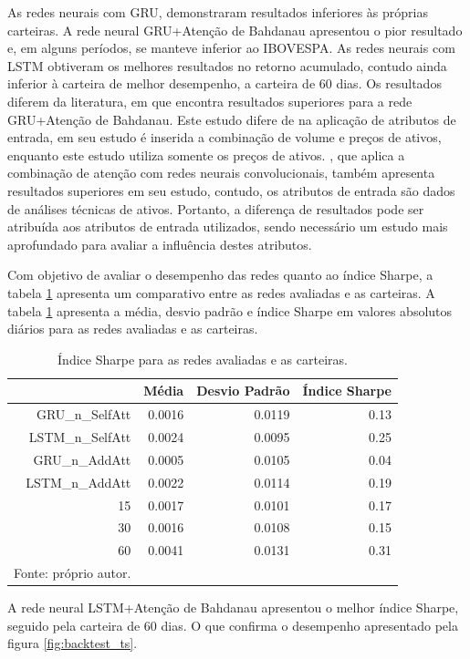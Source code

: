         \ipar As redes neurais com \acrshort{GRU}, demonstraram resultados inferiores às próprias carteiras. A rede neural \acrshort{GRU}+Atenção de Bahdanau apresentou o pior resultado e, em alguns períodos, se manteve inferior ao \acrshort{IBOVESPA}. As redes neurais com \acrshort{LSTM} obtiveram os melhores resultados no retorno acumulado, contudo ainda inferior à carteira de melhor desempenho, a carteira de 60 dias. Os resultados diferem da literatura, em que  encontra resultados superiores para a rede \acrshort{GRU}+Atenção de Bahdanau. Este estudo difere de  na aplicação de atributos de entrada, em seu estudo é inserida a combinação de volume e preços de ativos, enquanto este estudo utiliza somente os preços de ativos. , que aplica a combinação de atenção com redes neurais convolucionais, também apresenta resultados superiores em seu estudo, contudo, os atributos de entrada são dados de análises técnicas de ativos. Portanto, a diferença de resultados pode ser atribuída aos atributos de entrada utilizados, sendo necessário um estudo mais aprofundado para avaliar a influência destes atributos.

        \ipar Com objetivo de avaliar o desempenho das redes quanto ao índice Sharpe, a tabela \ref{tab:sharpe} apresenta um comparativo entre as redes avaliadas e as carteiras. A tabela \ref{tab:sharpe} apresenta a média, desvio padrão e índice Sharpe em valores absolutos diários para as redes avaliadas e as carteiras.

        \begin{table}[htbp]
            \centering
            \caption{Índice Sharpe para as redes avaliadas e as carteiras.}
            \label{tab:sharpe}
            \begin{tabular}{rrrr}
                \hline
                & \textbf{Média} & \textbf{Desvio Padrão} & \textbf{Índice Sharpe} \\ \hline \hline
                GRU\_n\_SelfAtt & 0.0016 & 0.0119 & 0.13 \\
                LSTM\_n\_SelfAtt & 0.0024 & 0.0095 & 0.25 \\
                GRU\_n\_AddAtt & 0.0005 & 0.0105 & 0.04 \\
                LSTM\_n\_AddAtt & 0.0022 & 0.0114 & 0.19 \\
                15 & 0.0017 & 0.0101 & 0.17 \\
                30 & 0.0016 & 0.0108 & 0.15 \\
                60 & 0.0041 & 0.0131 & 0.31 \\
                \hline
                \par \footnotesize Fonte: próprio autor.
            \end{tabular}
        \end{table}

        \ipar A rede neural \acrshort{LSTM}+Atenção de Bahdanau apresentou o melhor índice Sharpe, seguido pela carteira de 60 dias. O que confirma o desempenho apresentado pela figura \ref{fig:backtest_ts}. 
 
\pagebreak